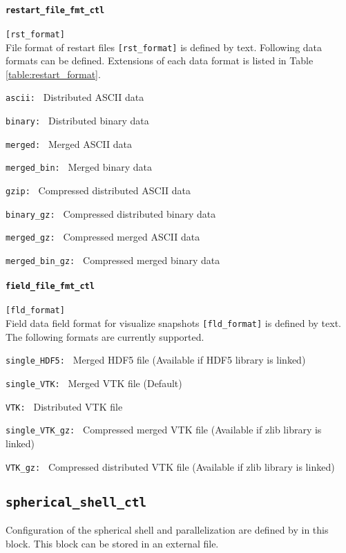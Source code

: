 \paragraph{\tt restart\_file\_fmt\_ctl}
\label{href_t:restart_file_fmt_ctl}
\verb|[rst_format]| \\
File format of restart files \verb|[rst_format]| is defined by text. Following data formats can be defined. Extensions of each data format is listed in Table \ref{table:restart_format}.
%
\begin{description}
\item{\tt ascii: }   Distributed ASCII data
\item{\tt binary: }  Distributed binary data
\item{\tt merged: }  Merged ASCII data
\item{\tt merged\_bin: }   Merged binary data
\item{\tt gzip: }            Compressed distributed ASCII data
\item{\tt binary\_gz: }      Compressed distributed binary data
\item{\tt merged\_gz: }      Compressed merged ASCII data
\item{\tt merged\_bin\_gz: } Compressed merged binary data
\end{description}
%

\paragraph{\tt field\_file\_fmt\_ctl}
\label{href_t:field_file_fmt_ctl}
\verb|[fld_format]| \\
Field data field format for visualize snapshots \verb|[fld_format]| is defined by text. The following formats are currently supported.
%
\begin{description}
\item{\tt single\_HDF5: }  Merged HDF5 file (Available if HDF5 library is linked)
\item{\tt single\_VTK: }   Merged VTK file (Default)
\item{\tt VTK: }           Distributed VTK file
\item{\tt single\_VTK\_gz: }   Compressed merged VTK file (Available if zlib library is linked)
\item{\tt VTK\_gz: }           Compressed distributed VTK file (Available if zlib library is linked)
\end{description}
%
%
%
%

\subsection{\tt spherical\_shell\_ctl}
\label{href_t:spherical_shell_ctl}
Configuration of the spherical shell and parallelization are defined by in this block. This block can be stored in an external file.
%
